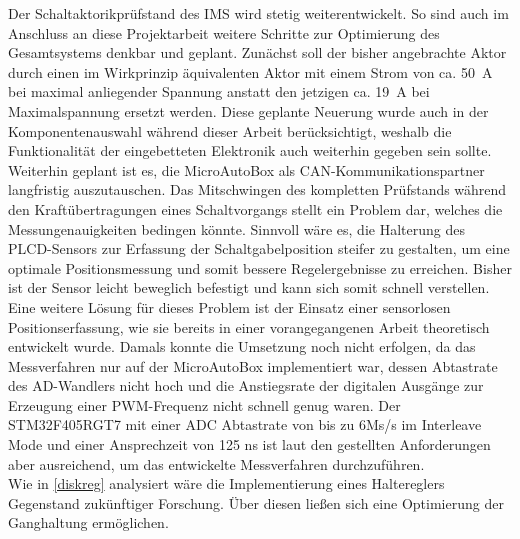 Der Schaltaktorikprüfstand des IMS wird stetig weiterentwickelt. So sind auch im Anschluss an diese Projektarbeit weitere Schritte zur Optimierung des Gesamtsystems denkbar und geplant. Zunächst soll der bisher angebrachte Aktor durch einen im Wirkprinzip äquivalenten Aktor mit einem Strom von ca. \SI{50}{A} bei maximal anliegender Spannung anstatt den jetzigen ca. \SI{19}{A} bei Maximalspannung ersetzt werden. Diese geplante Neuerung wurde auch in der Komponentenauswahl während dieser Arbeit  berücksichtigt, weshalb die Funktionalität der eingebetteten Elektronik auch weiterhin gegeben sein sollte. Weiterhin geplant ist es, die MicroAutoBox als CAN-Kommunikationspartner langfristig auszutauschen.
Das Mitschwingen des kompletten Prüfstands während den Kraftübertragungen eines Schaltvorgangs stellt ein Problem dar, welches die Messungenauigkeiten bedingen könnte. 
Sinnvoll wäre es, die Halterung des PLCD-Sensors zur Erfassung der Schaltgabelposition steifer zu gestalten, um eine optimale Positionsmessung und somit bessere Regelergebnisse zu erreichen. Bisher ist der Sensor leicht beweglich befestigt und kann sich somit schnell verstellen. Eine weitere Lösung für dieses Problem ist der Einsatz einer sensorlosen Positionserfassung, wie sie bereits in einer vorangegangenen Arbeit \cite{adp} theoretisch entwickelt wurde. Damals konnte die Umsetzung noch nicht erfolgen, da das Messverfahren nur auf der MicroAutoBox implementiert war, dessen Abtastrate des AD-Wandlers nicht hoch und die Anstiegsrate der digitalen Ausgänge zur Erzeugung einer PWM-Frequenz nicht schnell genug waren. Der STM32F405RGT7 mit einer ADC Abtastrate von bis zu 6Ms/s im Interleave Mode und einer Ansprechzeit von 125 ns ist laut den gestellten Anforderungen aber ausreichend, um das entwickelte Messverfahren durchzuführen.\\
Wie in \autoref{diskreg} analysiert wäre die Implementierung eines Haltereglers Gegenstand zukünftiger Forschung. Über diesen ließen sich eine Optimierung der Ganghaltung ermöglichen. 

